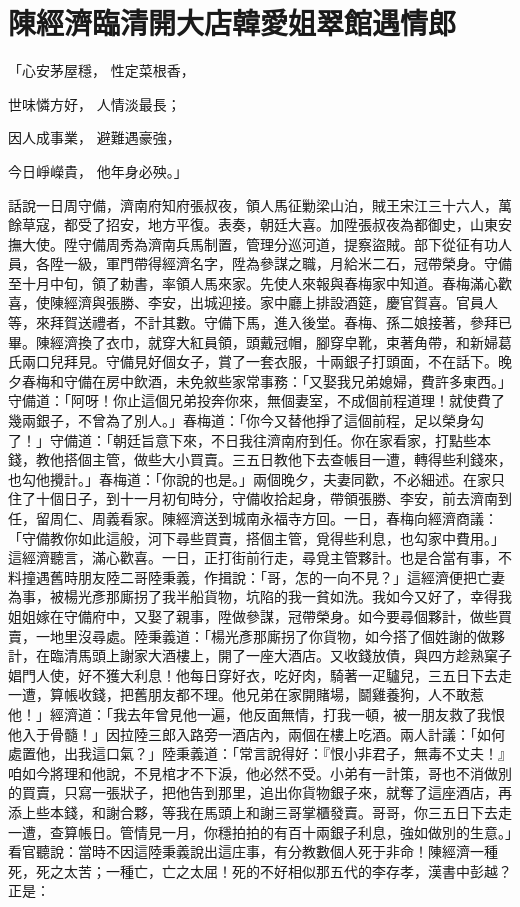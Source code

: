 %

\chapter{陳經濟臨清開大店\KG 韓愛姐翠館遇情郎}


「心安茅屋穩，  性定菜根香，

世味憐方好，  人情淡最長；

因人成事業，  避難遇豪強，

今日崢嶸貴，  他年身必殃。」

話說一日周守備，濟南府知府張叔夜，領人馬征勦梁山泊，賊王宋江三十六人，萬餘草寇，都受了招安，地方平復。表奏，朝廷大喜。加陞張叔夜為都御史，山東安撫大使。陞守備周秀為濟南兵馬制置，管理分巡河道，提察盜賊。部下從征有功人員，各陞一級，軍門帶得經濟名字，陞為參謀之職，月給米二石，冠帶榮身。守備至十月中旬，領了勅書，率領人馬來家。先使人來報與春梅家中知道。春梅滿心歡喜，使陳經濟與張勝、李安，出城迎接。家中廳上排設酒筵，慶官賀喜。官員人等，來拜賀送禮者，不計其數。守備下馬，進入後堂。春梅、孫二娘接著，參拜已畢。陳經濟換了衣巾，就穿大紅員領，頭戴冠帽，腳穿皁靴，束著角帶，和新婦葛氏兩口兒拜見。守備見好個女子，賞了一套衣服，十兩銀子打頭面，不在話下。晚夕春梅和守備在房中飲酒，未免敘些家常事務：「又娶我兄弟媳婦，費許多東西。」守備道：「阿呀！你止這個兄弟投奔你來，無個妻室，不成個前程道理！就使費了幾兩銀子，不曾為了別人。」春梅道：「你今又替他掙了這個前程，足以榮身勾了！」守備道：「朝廷旨意下來，不日我往濟南府到任。你在家看家，打點些本錢，教他搭個主管，做些大小買賣。三五日教他下去查帳目一遭，轉得些利錢來，也勾他攪計。」春梅道：「你說的也是。」兩個晚夕，夫妻同歡，不必細述。在家只住了十個日子，到十一月初旬時分，守備收拾起身，帶領張勝、李安，前去濟南到任，留周仁、周義看家。陳經濟送到城南永福寺方回。一日，春梅向經濟商議：「守備教你如此這般，河下尋些買賣，搭個主管，覓得些利息，也勾家中費用。」這經濟聽言，滿心歡喜。一日，正打街前行走，尋覓主管夥計。也是合當有事，不料撞遇舊時朋友陸二哥陸秉義，作揖說：「哥，怎的一向不見？」這經濟便把亡妻為事，被楊光彥那廝拐了我半船貨物，坑陷的我一貧如洗。我如今又好了，幸得我姐姐嫁在守備府中，又娶了親事，陞做參謀，冠帶榮身。如今要尋個夥計，做些買賣，一地里沒尋處。陸秉義道：「楊光彥那廝拐了你貨物，如今搭了個姓謝的做夥計，在臨清馬頭上謝家大酒樓上，開了一座大酒店。又收錢放債，與四方趁熟窠子娼門人使，好不獲大利息！他每日穿好衣，吃好肉，騎著一疋驢兒，三五日下去走一遭，算帳收錢，把舊朋友都不理。他兄弟在家開賭場，鬬雞養狗，人不敢惹他！」經濟道：「我去年曾見他一遍，他反面無情，打我一頓，被一朋友救了我恨他入于骨髓！」因拉陸三郎入路旁一酒店內，兩個在樓上吃酒。兩人計議：「如何處置他，出我這口氣？」陸秉義道：「常言說得好：『恨小非君子，無毒不丈夫！』咱如今將理和他說，不見棺才不下淚，他必然不受。小弟有一計策，哥也不消做別的買賣，只寫一張狀子，把他告到那里，追出你貨物銀子來，就奪了這座酒店，再添上些本錢，和謝合夥，等我在馬頭上和謝三哥掌櫃發賣。哥哥，你三五日下去走一遭，查算帳日。管情見一月，你穩拍拍的有百十兩銀子利息，強如做別的生意。」看官聽說：當時不因這陸秉義說出這庄事，有分教數個人死于非命！陳經濟一種死，死之太苦；一種亡，亡之太屈！死的不好相似那五代的李存孝，漢書中彭越？正是：

